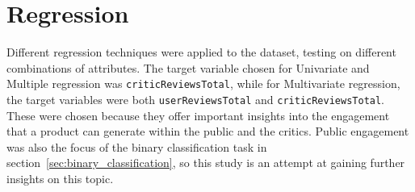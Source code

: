 \chapter{Regression}
\label{ch:capitolo4}
Different regression techniques were applied to the dataset, testing
on different combinations of attributes. The target variable chosen for
Univariate and Multiple regression was \texttt{criticReviewsTotal}, while
for Multivariate regression, the target variables were both
\texttt{userReviewsTotal} and \texttt{criticReviewsTotal}.
These were chosen because they offer important insights into the engagement
that a product can generate within the public and the critics. Public engagement was also the focus
of the binary classification task in section~\ref{sec:binary_classification}, so this study
is an attempt at gaining further insights on this topic.


